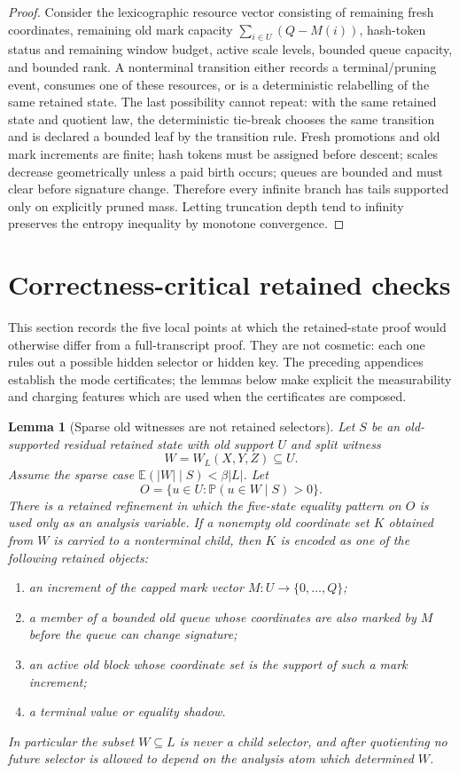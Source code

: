 \documentclass[11pt]{article}
\newtheorem{lemma}[theorem]{Lemma}
\theoremstyle{remark}
\newcommand{\E}{\mathbb E}
\newcommand{\Prob}{\mathbb P}
\begin{document}
\begin{proof}
Consider the lexicographic resource vector consisting of remaining fresh coordinates, remaining old mark capacity $\sum_{i\in U}(Q-M(i))$, hash-token status and remaining window budget, active scale levels, bounded queue capacity, and bounded rank.  A nonterminal transition either records a terminal/pruning event, consumes one of these resources, or is a deterministic relabelling of the same retained state.  The last possibility cannot repeat: with the same retained state and quotient law, the deterministic tie-break chooses the same transition and is declared a bounded leaf by the transition rule.  Fresh promotions and old mark increments are finite; hash tokens must be assigned before descent; scales decrease geometrically unless a paid birth occurs; queues are bounded and must clear before signature change.  Therefore every infinite branch has tails supported only on explicitly pruned mass.  Letting truncation depth tend to infinity preserves the entropy inequality by monotone convergence.
\end{proof}

\section{Correctness-critical retained checks}\label{app:critical}

This section records the five local points at which the retained-state proof would otherwise differ from a full-transcript proof.  They are not cosmetic: each one rules out a possible hidden selector or hidden key.  The preceding appendices establish the mode certificates; the lemmas below make explicit the measurability and charging features which are used when the certificates are composed.

\begin{lemma}[Sparse old witnesses are not retained selectors]\label{lem:crit-sparse-no-selector}
Let $S$ be an old-supported residual retained state with old support $U$ and split witness
\[
        W=W_L(X,Y,Z)\subseteq U.
\]
Assume the sparse case $\E(|W|\mid S)<\beta |L|$.  Let
\[
        O=\{u\in U:\Prob(u\in W\mid S)>0\}.
\]
There is a retained refinement in which the five-state equality pattern on $O$ is used only as an analysis variable.  If a nonempty old coordinate set $K$ obtained from $W$ is carried to a nonterminal child, then $K$ is encoded as one of the following retained objects:
\begin{enumerate}[label=\textup{(\alph*)}]
\item an increment of the capped mark vector $M:U\to\{0,\ldots,Q\}$;
\item a member of a bounded old queue whose coordinates are also marked by $M$ before the queue can change signature;
\item an active old block whose coordinate set is the support of such a mark increment;
\item a terminal value or equality shadow.
\end{enumerate}
In particular the subset $W\subseteq L$ is never a child selector, and after quotienting no future selector is allowed to depend on the analysis atom which determined $W$.
\end{lemma}
\end{document}
